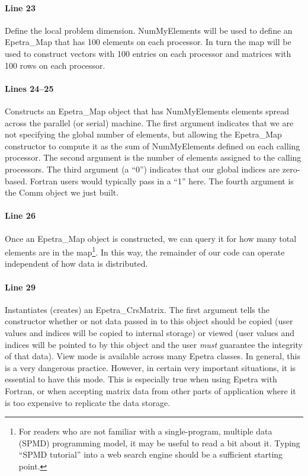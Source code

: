 \documentclass[12pt,relax]{AztecOOUserGuide}
\newcommand{\map}{Epetra\_Map}
\newcommand{\crsmatrix}{Epetra\_CrsMatrix}
\begin{document}
\paragraph{Line 23}
Define the local problem dimension.  NumMyElements will be used to
define an \map{} that has 100 elements on each processor.  In turn the
map will be used to construct vectors with 100 entries on each
processor and matrices with 100 rows on each processor.
\paragraph{Lines 24--25}
Constructs an \map{} object that has NumMyElements elements spread
across the parallel (or serial) machine.  The first argument indicates
that we are not specifying the global number of elements, but allowing
the \map{} constructor to compute it as the sum of
NumMyElements defined on each calling processor.  The second argument
is the number of elements assigned to the calling processors.  The
third argument (a
``0'') indicates that our global indices are zero-based.  Fortran
users would typically pass in a ``1'' here.  The fourth argument is the
Comm object we just built.
\paragraph{Line 26}
Once an \map{} object is constructed, we can query it for how many total
elements are in the map\footnote{For readers
who are not familiar with a single-program, multiple data (SPMD)
programming model, it may be useful to read a bit about it.  Typing
``SPMD tutorial'' into a web search engine should be a sufficient
starting point.}.  In this way, the remainder of our code can operate
independent of how data is distributed.
\paragraph{Line 29}
Instantiates (creates) an \crsmatrix{}.  The first argument tells the
constructor whether or not data passed in to this object should be
copied (user values and indices will be copied to internal storage) or
viewed (user values and indices will be pointed to by this object and
the user {\it must} guarantee the integrity of that data).  View mode
is available across many Epetra classes.  In general, this is a very
dangerous practice.  However, in certain very important situations, it
is essential to have this mode.  This is especially true when using
Epetra with Fortran, or when accepting matrix data from other parts of
application where it is too expensive to replicate the data storage.
\end{document}
